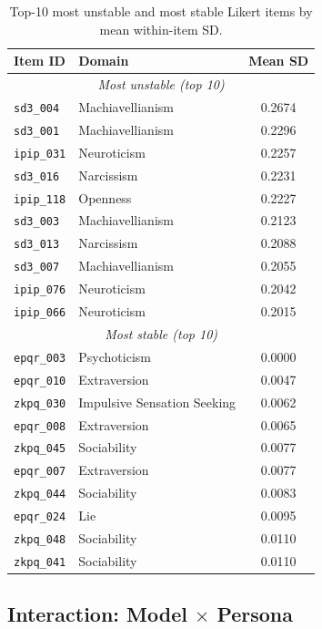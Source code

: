 \documentclass[11pt]{article}
\begin{document}
\begin{table}[t]
\centering\small
\caption{Top-10 most unstable and most stable Likert items by mean within-item SD.}
\label{tab:wsc_items_top}
\begin{tabular}{llc}
\toprule
Item ID & Domain & Mean SD \\
\midrule
\multicolumn{3}{c}{\itshape Most unstable (top 10)} \\
\midrule
\texttt{sd3\_004} & Machiavellianism & 0.2674 \\
\texttt{sd3\_001} & Machiavellianism & 0.2296 \\
\texttt{ipip\_031} & Neuroticism & 0.2257 \\
\texttt{sd3\_016} & Narcissism & 0.2231 \\
\texttt{ipip\_118} & Openness & 0.2227 \\
\texttt{sd3\_003} & Machiavellianism & 0.2123 \\
\texttt{sd3\_013} & Narcissism & 0.2088 \\
\texttt{sd3\_007} & Machiavellianism & 0.2055 \\
\texttt{ipip\_076} & Neuroticism & 0.2042 \\
\texttt{ipip\_066} & Neuroticism & 0.2015 \\
\midrule
\multicolumn{3}{c}{\itshape Most stable (top 10)} \\
\midrule
\texttt{epqr\_003} & Psychoticism & 0.0000 \\
\texttt{epqr\_010} & Extraversion & 0.0047 \\
\texttt{zkpq\_030} & Impulsive Sensation Seeking & 0.0062 \\
\texttt{epqr\_008} & Extraversion & 0.0065 \\
\texttt{zkpq\_045} & Sociability & 0.0077 \\
\texttt{epqr\_007} & Extraversion & 0.0077 \\
\texttt{zkpq\_044} & Sociability & 0.0083 \\
\texttt{epqr\_024} & Lie & 0.0095 \\
\texttt{zkpq\_048} & Sociability & 0.0110 \\
\texttt{zkpq\_041} & Sociability & 0.0110 \\
\bottomrule
\end{tabular}
\end{table}

\subsection{Interaction: Model $\times$ Persona}
\end{document}
